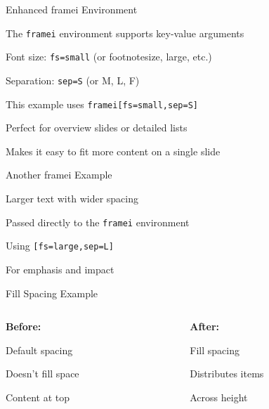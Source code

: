 \documentclass[11pt,compress,t,notes=noshow, xcolor=table]{beamer}
\begin{document}

\begin{framei}[fs=small,sep=S]{Enhanced framei Environment}
  \item The \texttt{framei} environment supports key-value arguments
  \item Font size: \texttt{fs=small} (or footnotesize, large, etc.)
  \item Separation: \texttt{sep=S} (or M, L, F)
  \item This example uses \texttt{framei[fs=small,sep=S]}
  \item Perfect for overview slides or detailed lists
  \item Makes it easy to fit more content on a single slide
\end{framei}


\begin{framei}[fs=large,sep=L]{Another framei Example}
  \item Larger text with wider spacing
  \item Passed directly to the \texttt{framei} environment
  \item Using \texttt{[fs=large,sep=L]}
  \item For emphasis and impact
\end{framei}


\begin{frame}{Fill Spacing Example}
  \begin{columns}[T]
    \begin{column}{0.48\textwidth}
      \textbf{Before:}
      \begin{minipage}[t][0.4\textheight][t]{\textwidth}
        \begin{itemizeM}
          \item Default spacing
          \item Doesn't fill space
          \item Content at top
        \end{itemizeM}
      \end{minipage}
    \end{column}
    
    \begin{column}{0.48\textwidth}
      \textbf{After:}
      \begin{minipage}[t][0.4\textheight][t]{\textwidth}
        \begin{itemizeF}
          \item Fill spacing
          \item Distributes items
          \item Across height
        \end{itemizeF}
      \end{minipage}
    \end{column}
  \end{columns}
\end{frame}
\end{document}
